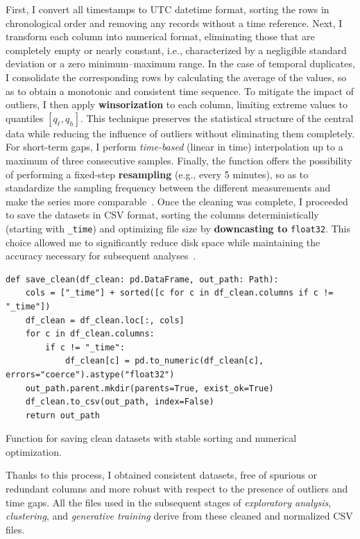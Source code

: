 First, I convert all timestamps to UTC datetime format, sorting the rows in chronological order and removing any records without a time reference.  
Next, I transform each column into numerical format, eliminating those that are completely empty or nearly constant, i.e., characterized by a negligible standard deviation or a zero minimum–maximum range.  
In the case of temporal duplicates, I consolidate the corresponding rows by calculating the average of the values, so as to obtain a monotonic and consistent time sequence.  
To mitigate the impact of outliers, I then apply \textbf{winsorization} to each column, limiting extreme values to quantiles $[q_{\ell}, q_{h}]$.  
This technique preserves the statistical structure of the central data while reducing the influence of outliers without eliminating them completely.  
For short-term gaps, I perform \emph{time-based} (linear in time) interpolation up to a maximum of three consecutive samples.  
Finally, the function offers the possibility of performing a fixed-step \textbf{resampling} (e.g., every 5 minutes), so as to standardize the sampling frequency between the different measurements and make the series more comparable~\cite{shumway2017time, box2015time}. Once the cleaning was complete, I proceeded to save the datasets in CSV format, sorting the columns deterministically (starting with \texttt{\_time}) and optimizing file size by \textbf{downcasting to} \texttt{float32}.  
This choice allowed me to significantly reduce disk space while maintaining the accuracy necessary for subsequent analyses~\cite{aggarwal2015data}.

\begin{listing}[H]
\begin{verbatim}
def save_clean(df_clean: pd.DataFrame, out_path: Path):
    cols = ["_time"] + sorted([c for c in df_clean.columns if c != "_time"])
    df_clean = df_clean.loc[:, cols]
    for c in df_clean.columns:
        if c != "_time":
            df_clean[c] = pd.to_numeric(df_clean[c], errors="coerce").astype("float32")
    out_path.parent.mkdir(parents=True, exist_ok=True)
    df_clean.to_csv(out_path, index=False)
    return out_path
\end{verbatim}
\caption{Function for saving clean datasets with stable sorting and numerical optimization.}
\end{listing}

Thanks to this process, I obtained consistent datasets, free of spurious or redundant columns and more robust with respect to the presence of outliers and time gaps.  
All the files used in the subsequent stages of \emph{exploratory analysis}, \emph{clustering}, and \emph{generative training} derive from these cleaned and normalized CSV files.

